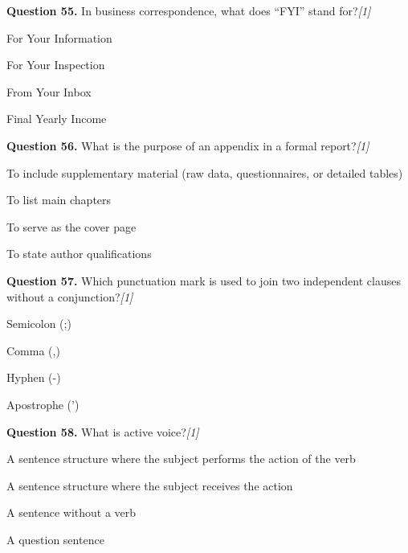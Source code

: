 \documentclass[11pt,a4paper]{article}
\newcommand{\pts}[1]{\hfill   \textit{[#1]}}
\begin{document}
\medskip




\noindent   \textbf{Question 55.} In business correspondence, what does ``FYI'' stand for?\pts{1}

\begin{parts}
  \item For Your Information
  \item For Your Inspection
  \item From Your Inbox
  \item Final Yearly Income
\end{parts}

\medskip




\noindent   \textbf{Question 56.} What is the purpose of an appendix in a formal report?\pts{1}

\begin{parts}
  \item To include supplementary material (raw data, questionnaires, or detailed tables)
  \item To list main chapters
  \item To serve as the cover page
  \item To state author qualifications
\end{parts}

\medskip




\noindent   \textbf{Question 57.} Which punctuation mark is used to join two independent clauses without a conjunction?\pts{1}

\begin{parts}
  \item Semicolon (;)
  \item Comma (,)
  \item Hyphen (-)
  \item Apostrophe (')
\end{parts}

\medskip




\noindent   \textbf{Question 58.} What is active voice?\pts{1}

\begin{parts}
  \item A sentence structure where the subject performs the action of the verb
  \item A sentence structure where the subject receives the action
  \item A sentence without a verb
  \item A question sentence
\end{parts}
\end{document}
